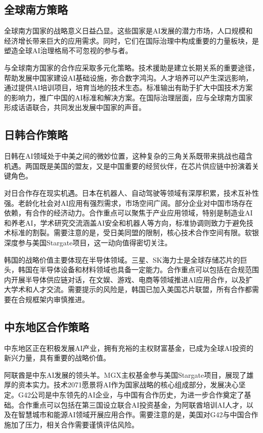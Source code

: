 \subsection{全球南方策略}

全球南方国家的战略意义日益凸显。这些国家是AI发展的潜力市场，人口规模和经济增长带来巨大的应用需求。同时，它们在国际治理中构成重要的力量板块，是塑造全球AI治理格局不可忽视的参与者。

与全球南方国家的合作应采取多元化策略。技术援助是建立长期关系的重要途径，帮助发展中国家建设AI基础设施，弥合数字鸿沟。人才培养可以产生深远影响，通过提供AI培训项目，培育当地的技术生态。标准输出有助于扩大中国技术方案的影响力，推广中国的AI标准和解决方案。在国际治理层面，应与全球南方国家形成话语联合，共同发出发展中国家的声音。

\subsection{日韩合作策略}

日韩在AI领域处于中美之间的微妙位置，这种复杂的三角关系既带来挑战也蕴含机遇。两国既是美国的盟友，又是中国重要的经贸伙伴，在芯片供应链中扮演着关键角色。

对日合作存在现实机遇。日本在机器人、自动驾驶等领域有深厚积累，技术互补性强。老龄化社会对AI应用有强烈需求，市场空间广阔。部分企业对中国市场存在依赖，有合作的经济动力。合作重点可以聚焦于产业应用领域，特别是制造业AI和养老AI，学术研究交流涵盖AI安全和机器人等方向，标准协调则致力于避免技术标准的割裂。需要注意的是，受日美同盟的限制，核心技术合作空间有限。软银深度参与美国Stargate项目，这一动向值得密切关注。

韩国的战略价值主要体现在半导体领域。三星、SK海力士是全球存储芯片的巨头，韩国在半导体设备和材料领域也具备一定能力。合作重点可以包括在合规范围内开展半导体供应链对话，在文娱、游戏、电商等领域推进AI应用合作，以及扩大学术和人才交流。需要提示的风险是，韩国已加入美国芯片联盟，所有合作都需要在合规框架内审慎推进。

\subsection{中东地区合作策略}

中东地区正在积极发展AI产业，拥有充裕的主权财富基金，已成为全球AI投资的新兴力量，具有重要的战略价值。

阿联酋是中东AI发展的领头羊。MGX主权基金参与美国Stargate项目，展现了雄厚的资本实力。技术2071愿景将AI作为国家战略的核心组成部分，发展决心坚定。G42公司是中东领先的AI企业，与中国有合作历史，为进一步合作奠定了基础。合作重点可以包括在第三国设立联合AI投资基金，为阿联酋培训AI人才，以及在智慧城市和能源AI领域开展应用合作。需要注意的是，美国对G42与中国合作施加了压力，相关合作需要谨慎评估风险。

